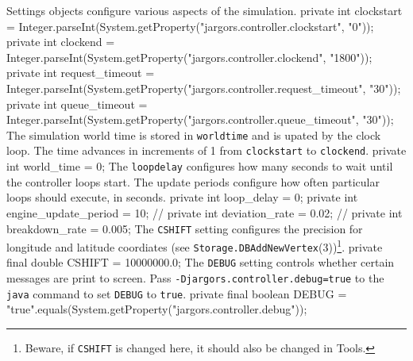  Settings objects configure various aspects of the simulation.
\nwenddocs{}\endmoddef{}
private int clockstart =
    Integer.parseInt(System.getProperty("jargors.controller.clockstart", "0"));
private int clockend =
    Integer.parseInt(System.getProperty("jargors.controller.clockend", "1800"));
private int request_timeout =
    Integer.parseInt(System.getProperty("jargors.controller.request_timeout", "30"));
private int queue_timeout =
    Integer.parseInt(System.getProperty("jargors.controller.queue_timeout", "30"));
\nwendcode{}\nwdocspar
The simulation world time is stored in {\tt{}world{}time} and is upated by the
clock loop. The time advances in increments of 1 from {\tt{}clockstart}
to {\tt{}clockend}.
\nwenddocs{}\plusendmoddef
private int world_time = 0;
\nwendcode{}\nwdocspar
The {\tt{}loop{}delay} configures how many seconds to wait until the controller
loops start. The update periods configure how often particular loops should
execute, in seconds.
\nwenddocs{}\plusendmoddef
private int loop_delay = 0;
private int engine_update_period = 10;
// private int deviation_rate = 0.02;
// private int breakdown_rate = 0.005;
\nwendcode{}\nwdocspar
The {\tt{}CSHIFT} setting configures the precision for longitude and latitude
coordiates (see {\tt{}Storage.\protect{}DBAddNewVertex}(3))\footnote{Beware, if {\tt{}CSHIFT}
is changed here, it should also be changed in Tools.}.
\nwenddocs{}\plusendmoddef
private final double CSHIFT = 10000000.0;
\nwendcode{}\nwdocspar
The {\tt{}DEBUG} setting controls whether certain messages are print to screen.
Pass {\tt{}-Djargors.controller.debug=true} to the {\tt{}java} command to set
{\tt{}DEBUG} to {\tt{}true}.
\nwenddocs{}\plusendmoddef
private final boolean DEBUG =
    "true".equals(System.getProperty("jargors.controller.debug"));
\nwendcode{}\nwdocspar

